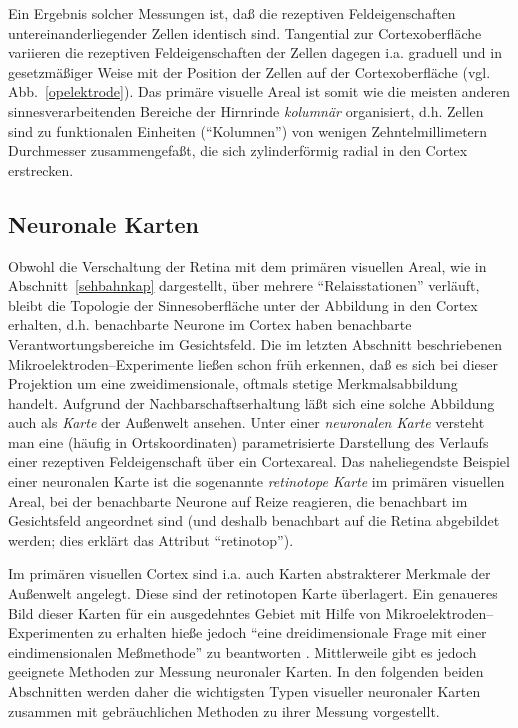 Ein Ergebnis solcher Messungen ist, daß die rezeptiven Feldeigenschaften
untereinanderliegender Zellen identisch sind. Tangential zur
Cortexoberfläche variieren die rezeptiven Feldeigenschaften der Zellen
dagegen i.a. graduell und in gesetzmäßiger Weise mit der Position der
Zellen auf der Cortexoberfläche (vgl. Abb.~\ref{opelektrode}). Das
primäre visuelle Areal ist somit wie die meisten anderen
sinnesverarbeitenden Bereiche der Hirnrinde \emph{kolumnär} organisiert,
d.h. Zellen sind zu funktionalen Einheiten (``Kolumnen'') von wenigen
Zehntelmillimetern Durchmesser zusammengefaßt, die sich zylinderförmig
radial in den Cortex erstrecken.

\subsection{Neuronale Karten}

Obwohl die Verschaltung der Retina mit dem primären visuellen Areal, wie
in Abschnitt~\ref{sehbahnkap} dargestellt, über mehrere
``Relaisstationen'' verläuft, bleibt die Topologie der Sinnesoberfläche
unter der Abbildung in den Cortex erhalten, d.h. benachbarte Neurone im
Cortex haben benachbarte Verantwortungsbereiche im Gesichtsfeld. Die im
letzten Abschnitt beschriebenen Mikroelektroden--Experimente ließen schon
früh erkennen, daß es sich bei dieser Projektion um eine
zweidimensionale, oftmals stetige Merkmalsabbildung handelt. Aufgrund der
Nachbarschaftserhaltung läßt sich eine solche Abbildung auch als
\emph{Karte} der Außenwelt ansehen. Unter einer \emph{neuronalen Karte}
versteht man eine (häufig in Ortskoordinaten) parametrisierte Darstellung
des Verlaufs einer rezeptiven Feldeigenschaft über ein Cortexareal. Das
naheliegendste Beispiel einer neuronalen Karte ist die sogenannte
\emph{retinotope Karte} im primären visuellen Areal, bei der benachbarte
Neurone auf Reize reagieren, die benachbart im Gesichtsfeld angeordnet sind
(und deshalb benachbart auf die Retina abgebildet werden; dies erklärt das
Attribut ``retinotop'').

Im primären visuellen Cortex sind i.a. auch Karten abstrakterer Merkmale der
\mbox{Außenwelt} angelegt. Diese sind der retinotopen Karte überlagert.
Ein genaueres Bild dieser Karten für ein ausgedehntes Gebiet mit Hilfe von
Mikroelektroden--Experimenten zu erhalten hieße jedoch ``eine
dreidimensionale Frage mit einer eindimensionalen Meßmethode'' zu
beantworten \cite{hubel:1989}. Mittlerweile gibt es jedoch geeignete
Methoden zur Messung neuronaler Karten. In den folgenden beiden Abschnitten
werden daher die wichtigsten Typen visueller neuronaler Karten zusammen mit
gebräuchlichen Methoden zu ihrer Messung vorgestellt.

